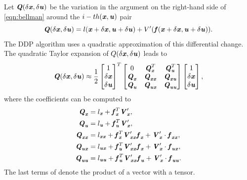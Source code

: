 Let $\bQ(\dx,\du)$ be the variation in the argument on the right-hand side of \cref{eqn:bellman} around the $i-th (\bx,\bu)$ pair
\begin{equation}\label{eqn:Q}
\bQ(\dx,\du)=l(\bx+\dx,\bu+\du)+V'(\bfun(\bx+\dx,\bu+\du)).
\end{equation}
The \gls{DDP} algorithm uses a quadratic approximation of this differential change. The quadratic Taylor expansion of $Q(\dx,\du)$ leads to
\begin{equation}\label{eqn:QApprox}
\bQ(\dx,\du) \approx \dfrac{1}{2} 
\begin{bmatrix} 1 \\ \dx \\ \du \end{bmatrix}^T 
\begin{bmatrix} 0 & \bQ_{\bx}^T & \bQ_{\bu}^T \\
\bQ_{\bx} & \bQ_{\bx\bx} & \bQ_{\bx\bu} \\
\bQ_{\bu} & \bQ_{\bu\bx} & \bQ_{\bu\bu} \end{bmatrix}
\begin{bmatrix} 1 \\ \dx \\ \du \end{bmatrix},
\end{equation}
where the coefficients can be computed to 
\begin{subequations}\label{eqn:QApproxCoeff}
\begin{align}
\bQ_{\bx} &= l_{\bx}+\bfun_{\bx}^T \bV_{\bx}^\prime, \\
\bQ_{\bu} &= l_{\bu}+\bfun_{\bu}^T \bV_{\bx}^\prime, \\
\bQ_{\bx\bx} &= l_{\bx\bx}+\bfun_{\bx}^T \bV_{\bx\bx}^\prime\bfun_{\bx}+\bV_{\bx}^\prime\cdot\bfun_{\bx\bx}  \label{subeqn:Qxx},\\
\bQ_{\bu\bx} &= l_{\bu\bx}+\bfun_{\bu}^T \bV_{\bx\bx}^\prime\bfun_{\bx}+\bV_{\bx}^\prime\cdot\bfun_{\bu\bx} \label{subeqn:Qux},\\
\bQ_{\bu\bu} &= l_{\bu\bu}+\bfun_{\bu}^T \bV_{\bx\bx}^\prime\bfun_{\bu}+\bV_{\bx}^\prime\cdot\bfun_{\bu\bu} \label{subeqn:Quu}.
\end{align}
\end{subequations}
The last terms of  denote the product of a vector with a tensor. 

